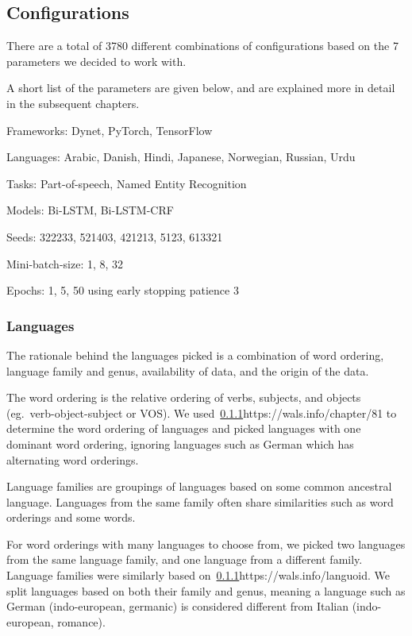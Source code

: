 
\subsection{Configurations}

There are a total of 3780 different combinations of configurations based on the
7 parameters we decided to work with. 

A short list of the parameters are given below, and are explained more in detail
in the subsequent chapters.

Frameworks: Dynet, PyTorch, TensorFlow

Languages: Arabic, Danish, Hindi, Japanese, Norwegian, Russian, Urdu

Tasks: Part-of-speech, Named Entity Recognition

Models: Bi-LSTM, Bi-LSTM-CRF

Seeds: 322233, 521403, 421213, 5123, 613321

Mini-batch-size: 1, 8, 32

Epochs: 1, 5, 50 using early stopping patience 3


\subsubsection{Languages}

The rationale behind the languages picked is a combination of word ordering,
language family and genus, availability of data, and the origin of the data.

The word ordering is the relative ordering of verbs, subjects, and objects (eg.\
verb-object-subject or VOS). We used~\ref{}{https://wals.info/chapter/81} to
determine the word ordering of languages and picked languages with one dominant
word ordering, ignoring languages such as German which has alternating word
orderings.

Language families are groupings of languages based on some common ancestral
language. Languages from the same family often share similarities such as word
orderings and some words. 

For word orderings with many languages to choose from, we picked two languages
from the same language family, and one language from a different family.
Language families were similarly based on~\ref{}{https://wals.info/languoid}. We
split languages based on both their family and genus, meaning a language such as
German (indo-european, germanic) is considered different from Italian
(indo-european, romance).


